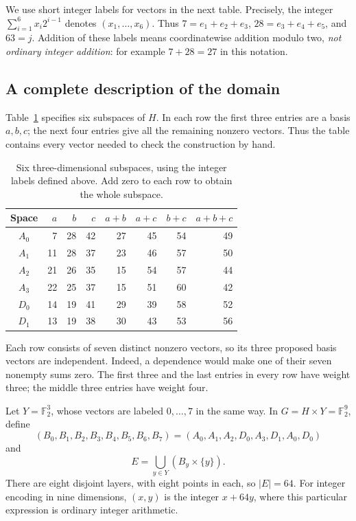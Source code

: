 \documentclass[11pt]{article}
\numberwithin{equation}{section}
\theoremstyle{definition}
\theoremstyle{remark}\newtheorem{remark}[theorem]{Remark}
\newcommand{\F}{\mathbb F_2}
\begin{document}
We use short integer labels for vectors in the next table. Precisely, the integer $\sum_{i=1}^6x_i2^{i-1}$ denotes $(x_1,\ldots,x_6)$. Thus $7=e_1+e_2+e_3$, $28=e_3+e_4+e_5$, and $63=j$. Addition of these labels means coordinatewise addition modulo two, \emph{not ordinary integer addition}: for example $7+28=27$ in this notation.

\subsection{A complete description of the domain}
Table~\ref{tab:spaces} specifies six subspaces of $H$. In each row the first three entries are a basis $a,b,c$; the next four entries give all the remaining nonzero vectors. Thus the table contains every vector needed to check the construction by hand.
\begin{table}[ht]
\centering
\begin{tabular}{c|rrr|rrr|r}
\toprule
Space & $a$&$b$&$c$&$a+b$&$a+c$&$b+c$&$a+b+c$\\\midrule
$A_0$&7&28&42&27&45&54&49\\
$A_1$&11&28&37&23&46&57&50\\
$A_2$&21&26&35&15&54&57&44\\
$A_3$&22&25&37&15&51&60&42\\
$D_0$&14&19&41&29&39&58&52\\
$D_1$&13&19&38&30&43&53&56\\\bottomrule
\end{tabular}
\caption{Six three-dimensional subspaces, using the integer labels defined above. Add zero to each row to obtain the whole subspace.}\label{tab:spaces}
\end{table}
Each row consists of seven distinct nonzero vectors, so its three proposed basis vectors are independent. Indeed, a dependence would make one of their seven nonempty sums zero. The first three and the last entries in every row have weight three; the middle three entries have weight four.

Let $Y=\F^3$, whose vectors are labeled $0,\ldots,7$ in the same way. In $G=H\times Y=\F^9$, define
\begin{equation}\label{eq:layers}
 (B_0,B_1,B_2,B_3,B_4,B_5,B_6,B_7)
 =(A_0,A_1,A_2,D_0,A_3,D_1,A_0,D_0)
\end{equation}
and
\begin{equation}\label{eq:E}
 \boxed{\displaystyle E=\bigcup_{y\in Y}(B_y\times\{y\}).}
\end{equation}
There are eight disjoint layers, with eight points in each, so $|E|=64$. For integer encoding in nine dimensions, $(x,y)$ is the integer $x+64y$, where this particular expression is ordinary integer arithmetic.
\end{document}
